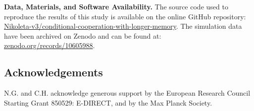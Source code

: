 \documentclass[9pt,twocolumn,twoside]{pnas-new}
\begin{document}
\noindent
{\bf Data, Materials, and Software Availability.} The source code used to
reproduce the results of this study is available on the online GitHub
repository:
\href{https://github.com/Nikoleta-v3/conditional-cooperation-with-longer-memory}{Nikoleta-v3/conditional-cooperation-with-longer-memory}.
The simulation data have been archived on Zenodo and can be found at:
\href{https://zenodo.org/records/10605988}{zenodo.org/records/10605988}.

\subsection*{Acknowledgements}

N.G. and C.H. acknowledge generous support by the European Research Council
Starting Grant 850529: E-DIRECT, and by the Max Planck Society.


{\setlength{\bibsep}{0\baselineskip}
%

}


\clearpage
\newpage
\end{document}
